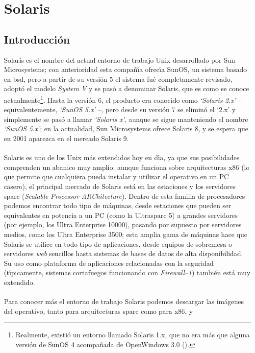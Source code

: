 \chapter{Solaris}
\section{Introducci\'on}
Solaris es el nombre del actual entorno de trabajo Unix desarrollado por Sun 
Microsystems; con anterioridad esta compa\~n\'{\i}a ofrec\'{\i}a SunOS, un
sistema basado en {\sc bsd}, pero a partir de su versi\'on 5 el sistema fu\'e
completamente revisado, adopt\'o el modelo {\it System V} y se pas\'o a 
denominar Solaris, que es como se conoce 
actualmente\footnote{Realmente, existi\'o un entorno llamado Solaris 1.x, que 
no era m\'as que alguna versi\'on de SunOS 4 acompa\~nada de OpenWindows 3.0 
(\cite{kn:dik99}).}. Hasta la versi\'on 6, el producto era conocido como {\it
`Solaris 2.x'} -- equivalentemente, {\it `SunOS 5.x'} --, pero desde su 
versi\'on 7 se elimin\'o el `2.x' y simplemente se pas\'o a llamar {\it 
`Solaris x'}, aunque se sigue manteniendo el nombre {\it `SunOS 5.x'}; en la
actualidad, Sun Microsystems ofrece Solaris 8, y se espera que en 2001 aparezca
en el mercado Solaris 9.\\
\\Solaris es uno de los Unix m\'as extendidos hoy en d\'{\i}a, ya que sus
posibilidades comprenden un abanico muy amplio; aunque funciona sobre 
arquitecturas x86 (lo que permite que cualquiera pueda instalar y utilizar el 
operativo en un PC casero), el principal mercado de Solaris est\'a en las 
estaciones y los servidores {\sc sparc} ({\it Scalable Processor ARChitecture}).
Dentro de esta familia de procesadores podemos encontrar todo tipo de 
m\'aquinas, desde estaciones que pueden ser equivalentes en potencia a un PC
(como la Ultra{\sc sparc} 5) a grandes servidores (por ejemplo, los Ultra 
Enterprise 10000), 
pasando por supuesto por servidores medios, como los Ultra Enterprise 3500;
esta amplia gama de m\'aquinas hace que Solaris se utilice en todo tipo de 
aplicaciones, desde equipos de sobremesa o servidores {\it web} sencillos hasta 
sistemas de bases de datos de alta disponibilidad. Su uso como plataforma de 
aplicaciones relacionadas con la seguridad (t\'{\i}picamente, sistemas 
cortafuegos funcionando con {\it Firewall--1}) tambi\'en est\'a muy extendido.\\
\\Para conocer m\'as el entorno de trabajo Solaris podemos descargar las 
im\'agenes del operativo, tanto para arquitecturas {\sc sparc} como para x86, y
